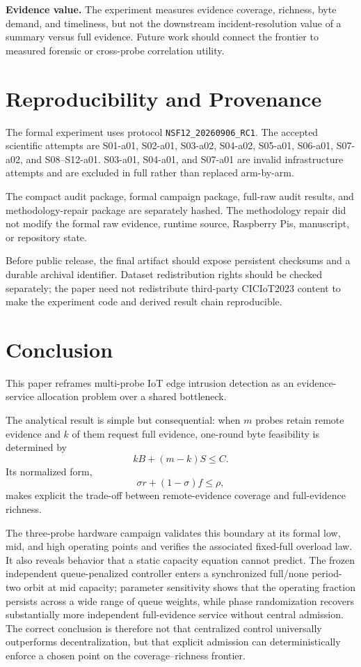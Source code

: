 \documentclass[10pt,journal]{IEEEtran}
\begin{document}
\textbf{Evidence value.}
The experiment measures evidence coverage, richness, byte demand, and
timeliness, but not the downstream incident-resolution value of a
summary versus full evidence. Future work should connect the frontier to
measured forensic or cross-probe correlation utility.

\section{Reproducibility and Provenance}
\label{sec:reproducibility}

The formal experiment uses protocol
\texttt{NSF12\_20260906\_RC1}.
The accepted scientific attempts are S01-a01, S02-a01, S03-a02,
S04-a02, S05-a01, S06-a01, S07-a02, and S08--S12-a01.
S03-a01, S04-a01, and S07-a01 are invalid infrastructure attempts and
are excluded in full rather than replaced arm-by-arm.

The compact audit package, formal campaign package, full-raw audit
results, and methodology-repair package are separately hashed.
The methodology repair did not modify the formal raw evidence,
runtime source, Raspberry Pis, manuscript, or repository state.

Before public release, the final artifact should expose persistent
checksums and a durable archival identifier. Dataset redistribution
rights should be checked separately; the paper need not redistribute
third-party CICIoT2023 content to make the experiment code and derived
result chain reproducible.

\section{Conclusion}
\label{sec:conclusion}

This paper reframes multi-probe IoT edge intrusion detection as an
evidence-service allocation problem over a shared bottleneck.

The analytical result is simple but consequential: when $m$ probes
retain remote evidence and $k$ of them request full evidence, one-round
byte feasibility is determined by
\[
kB+(m-k)S\leq C.
\]
Its normalized form,
\[
\sigma r+(1-\sigma)f\leq\rho,
\]
makes explicit the trade-off between remote-evidence coverage and
full-evidence richness.

The three-probe hardware campaign validates this boundary at its formal
low, mid, and high operating points and verifies the associated
fixed-full overload law. It also reveals behavior that a static capacity
equation cannot predict. The frozen independent queue-penalized
controller enters a synchronized full/none period-two orbit at mid
capacity; parameter sensitivity shows that the operating fraction
persists across a wide range of queue weights, while phase randomization
recovers substantially more independent full-evidence service without
central admission. The correct conclusion is therefore not that
centralized control universally outperforms decentralization, but that
explicit admission can deterministically enforce a chosen point on the
coverage--richness frontier.
\end{document}
